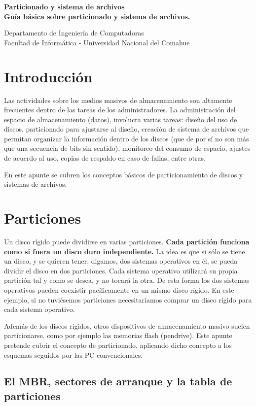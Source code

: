 \documentclass[12pt]{article}
\def\maketitle{

 \makeatletter
 {\color{bl} \centering \huge \sc \textbf{
 Particionado y sistema de archivos \\ 
\large \vspace*{-8pt} \color{black} Guía básica sobre particionado y sistema de archivos.
 \vspace*{8pt} }\par}
 \makeatother


 \makeatletter
 {\centering \small 
 	Departamento de Ingeniería de Computadoras \\
 	Facultad de Informática - Universidad Nacional del Comahue \\
 	\vspace{20pt} }
 \makeatother

}
\begin{document}
\thispagestyle{empty}
\maketitle
\setlength{\parindent}{0pt}

\section*{Introducción}

Las actividades sobre los medios masivos de almacenamiento son altamente 
frecuentes dentro de las tareas de los administradores. La administración 
del espacio de almacenamiento (datos), involucra varias tareas: diseño 
del uso de discos, particionado para ajustarse al diseño, creación de 
sistema de archivos que permitan organizar la información dentro de los
discos (que de por sí no son más que una secuencia de bits sin sentido),
monitoreo del consumo de espacio, ajustes de acuerdo al uso, copias de 
respaldo en caso de fallas, entre otras. 

En este apunte se cubren los conceptos básicos de particionamiento de 
discos y sistemas de archivos.  

\section*{Particiones}

Un disco rígido puede dividirse en varias particiones. {\bf Cada partición 
funciona como si fuera un disco duro independiente.} 
La idea es que si sólo se tiene un disco, y se quieren tener, digamos,
 dos sistemas operativos en él, se pueda dividir 
el disco en dos particiones. Cada sistema operativo utilizará su propia 
partición tal y como se desea, y no tocará 
la otra. De esta forma los dos sistemas operativos pueden coexistir 
pacíficamente en un mismo disco rígido. En este ejemplo, si no tuviésemos
particiones necesitaríamos comprar un disco rígido para cada sistema 
operativo.

Además de los discos rígidos, otros dispositivos de almacenamiento 
masivo suelen particionarse, como por ejemplo las memorias flash (pendrive).
Este apunte pretende cubrir el concepto de particionado, aplicando  
dicho concepto a los esquemas seguidos por las PC convencionales.  


\subsection*{El MBR, sectores de arranque y la tabla de particiones}
\end{document}
